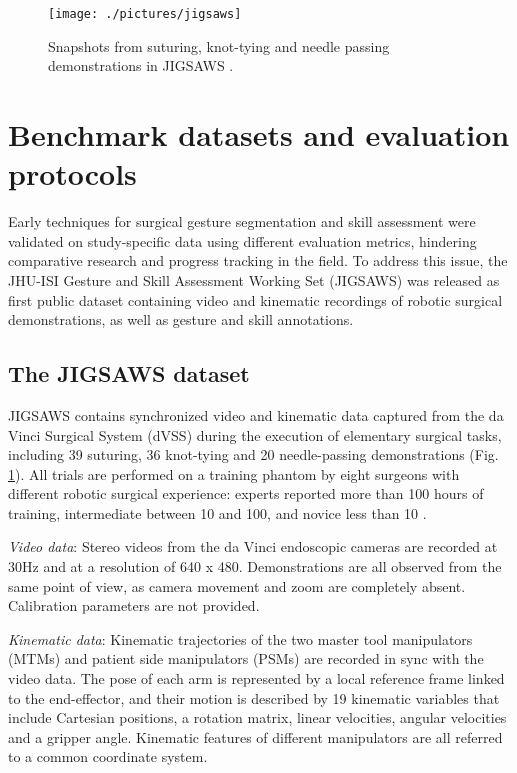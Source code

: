 \documentclass[journal]{IEEEtran}
\begin{document}
\begin{figure}[t]
	\centering
	\texttt{[image: ./pictures/jigsaws]}
	\caption[JIGSAWS video snapshots.]{Snapshots from suturing, knot-tying and needle passing demonstrations in JIGSAWS \cite{Ahmidi2017}.}
	\label{fig:jigsaws}
\end{figure}

\section{Benchmark datasets and evaluation protocols} \label{Method comparison}
Early techniques for surgical gesture segmentation and skill assessment were validated on study-specific data using different evaluation metrics, hindering comparative research and progress tracking in the field.
To address this issue, the JHU-ISI Gesture and Skill Assessment Working Set (JIGSAWS) \cite{Gao2014, Ahmidi2017} was released as first public dataset containing video and kinematic recordings of robotic surgical demonstrations, as well as gesture and skill annotations. 

\subsection{The JIGSAWS dataset} \label{The JIGSAWS dataset}
JIGSAWS contains synchronized video and kinematic data captured from the da Vinci Surgical System (dVSS) during the execution of elementary surgical tasks, including 39 suturing, 36 knot-tying and 20 needle-passing demonstrations (Fig. \ref{fig:jigsaws}). All trials are performed on a training phantom by eight surgeons with different robotic surgical experience: experts reported more than 100 hours of training, intermediate between 10 and 100, and novice less than 10 \cite{Gao2014}. 

\textit{Video data}: Stereo videos from the da Vinci endoscopic cameras are recorded at 30Hz and at a resolution of 640 x 480. 
Demonstrations are all observed from the same point of view, as camera movement and zoom are completely absent.
Calibration parameters are not provided.

\textit{Kinematic data}: Kinematic trajectories of the two master tool manipulators (MTMs) and patient side manipulators (PSMs) are recorded in sync with the video data.
The pose of each arm is represented by a local reference frame linked to the end-effector, and their motion is described by 19 kinematic variables that include Cartesian positions, a rotation matrix, linear velocities, angular velocities and a gripper angle. Kinematic features of different manipulators are all referred to a common coordinate system.
\end{document}
